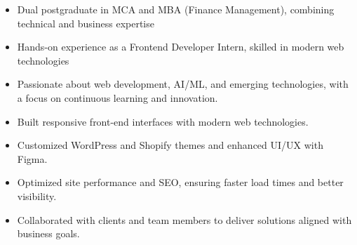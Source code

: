 \documentclass[10pt,a4paper,ragged2e]{altacv}
\begin{document}
\tagline{}

\begin{fullwidth}
\makecvheader
\end{fullwidth}


\begin{itemize}
\item Dual postgraduate in MCA and MBA (Finance Management), combining technical and business expertise
\smallskip
\item Hands-on experience as a Frontend Developer Intern, skilled in modern web technologies
\smallskip
\item Passionate about web development, AI/ML, and emerging technologies, with a focus on continuous learning and innovation.
 \end{itemize}
\smallskip


\begin{itemize}
\item Built responsive front-end interfaces with modern web technologies.
\smallskip
\item Customized WordPress and Shopify themes and enhanced UI/UX with Figma.
\smallskip
\item Optimized site performance and SEO, ensuring faster load times and better visibility. 
\smallskip
\item Collaborated with clients and team members to deliver solutions aligned with business goals.
\end{itemize}
\smallskip

\end{document}
